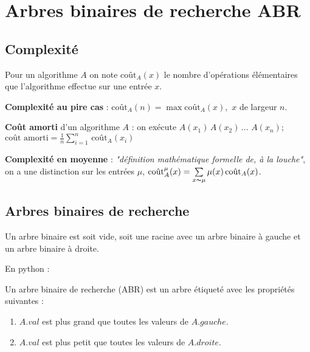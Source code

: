 \chapter{Arbres binaires de recherche ABR}

\section{Complexité}

Pour un algorithme $A$ on note $\text{coût}_{A}(x)$ le nombre d'opérations élémentaires que l'algorithme effectue sur une entrée $x$.

\textbf{Complexité au pire cas} : $\text{coût}_{A}(n) = \max \text{coût}_{A}(x)$, $\,x$ de largeur $n$.

\textbf{Coût amorti} d'un algorithme $A$ : on exécute $A(x_{1})\, A(x_{2})\, ...\,\, A(x_{n})$; $\text{coût amorti} = \frac{1}{n}\sum\limits_{i = 1}^{n}\, \text{coût}_{A}(x_{i})$

\textbf{Complexité en moyenne} : \textit{"définition mathématique formelle de, à la louche"}, on a une distinction sur les entrées $\mu$, $\text{coût}_{A}^{\mu}(x) =\sum\limits_{x\thicksim \mu} \mu(x)\, \text{coût}_{A}(x)$.

\section{Arbres binaires de recherche}

\begin{definition}
Un arbre binaire est soit vide, soit une racine avec un arbre binaire à gauche et un arbre binaire à droite.
\end{definition}

En python :



\begin{definition}
Un arbre binaire de recherche (ABR) est un arbre étiqueté avec les propriétés suivantes :

\begin{enumerate}
\item $A.val$ est plus grand que toutes les valeurs de $A.gauche$.
\item $A.val$ est plus petit que toutes les valeurs de $A.droite$.
\end{enumerate}
\end{definition}

